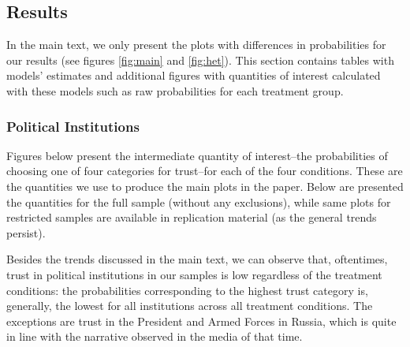 \documentclass[11pt, ngerman,english,a4]{article}
\begin{document}
\newpage
\subsection{Results}

In the main text, we only present the plots with differences in probabilities for our results (see figures \ref{fig:main} and \ref{fig:het}). This section contains tables with models' estimates and additional figures with quantities of interest calculated with these models such as raw probabilities for each treatment group. 

\subsubsection*{Political Institutions}


\clearpage






\newpage




\clearpage

Figures below present the intermediate quantity of interest--the probabilities of choosing one of four categories for trust--for each of the four conditions. These are the quantities we use to produce the main plots in the paper. Below are presented the quantities for the full sample (without any exclusions), while same plots for restricted samples are available in replication material (as the general trends persist). 

Besides the trends discussed in the main text, we can observe that, oftentimes, trust in political institutions in our samples is low regardless of the treatment conditions: the probabilities corresponding to the highest trust category is, generally, the lowest for all institutions across all treatment conditions. The exceptions are trust in the President and Armed Forces in Russia, which is quite in line with the narrative observed in the media of that time. 
\end{document}
